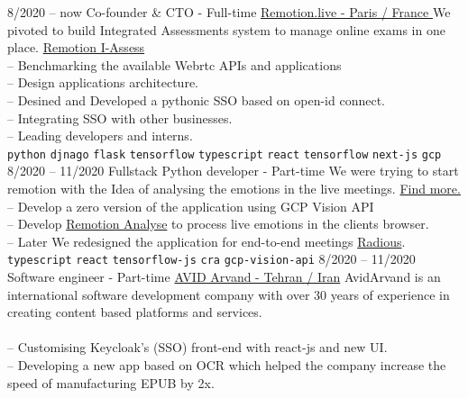 \documentclass[9pt]{developercv}
\begin{document}
\begin{entrylist}
	\entry
	{8/2020 -- now}
	{Co-founder \& CTO - Full-time}
	{\href{https://remotion.live/}{Remotion.live - Paris / France }}
	{We pivoted to build Integrated Assessments system to manage online exams in one place.
		\href{https://remotion.live/} {Remotion I-Assess} \\
		-- Benchmarking the available Webrtc APIs and applications  \\
		-- Design applications architecture. \\
		-- Desined and Developed a pythonic SSO based on open-id connect. \\
		-- Integrating SSO with other businesses. \\
		-- Leading developers and interns. \\
		\texttt{python}\slashsep
		\texttt{djnago}\slashsep
		\texttt{flask}\slashsep
		\texttt{tensorflow}\slashsep
		\texttt{typescript}\slashsep
		\texttt{react}\slashsep
		\texttt{tensorflow}\slashsep
		\texttt{next-js}\slashsep
		\texttt{gcp}\slashsep
	}
	\entry
	{8/2020 -- 11/2020}
	{Fullstack Python developer - Part-time}
	{}
	{We were trying to start remotion with the Idea of analysing the emotions in the live meetings.
		\href{https://remotion.live/} {Find more.} \\
		-- Develop a zero version of the application using GCP Vision API \\
		-- Develop \href{https://analyse.remotion.live/} {Remotion Analyse} to process live emotions in the clients browser. \\
		-- Later We redesigned the application for end-to-end meetings \href{https://radious.fr/} {Radious}. \\
		\texttt{typescript}\slashsep
		\texttt{react}\slashsep
		\texttt{tensorflow-js}\slashsep
		\texttt{cra}\slashsep
		\texttt{gcp-vision-api}\slashsep
	}
	\entry
	{8/2020 -- 11/2020}
	{Software engineer - Part-time}
	{
		\href{https://www.linkedin.com/company/avid-technology-development/}{AVID Arvand - Tehran / Iran}}
	{
		AvidArvand is an international software development company with over 30 years of experience in creating content based platforms and services. \\ \\
		-- Customising Keycloak's (SSO) front-end with react-js and new UI. \\
		-- Developing a new app based on OCR which helped
		the company increase the speed of manufacturing EPUB by 2x. \\
}
\end{entrylist}
\end{document}
